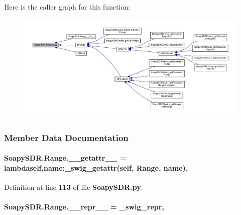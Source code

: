 Here is the caller graph for this function\+:
\nopagebreak
\begin{figure}[H]
\begin{center}
\leavevmode
\includegraphics[width=350pt]{d7/de1/classSoapySDR_1_1Range_accd0e887cd11dee091a82532c9596ce1_icgraph}
\end{center}
\end{figure}




\subsubsection{Member Data Documentation}
\paragraph[{\+\_\+\+\_\+getattr\+\_\+\+\_\+}]{\setlength{\rightskip}{0pt plus 5cm}Soapy\+S\+D\+R.\+Range.\+\_\+\+\_\+getattr\+\_\+\+\_\+ = lambdaself,name\+:\+\_\+swig\+\_\+getattr(self, {\bf Range}, {\bf name})\hspace{0.3cm}{\ttfamily [static]}, {\ttfamily [private]}}\label{classSoapySDR_1_1Range_a8811aae1d9f39646abb2340e400d0a0b}


Definition at line {\bf 113} of file {\bf Soapy\+S\+D\+R.\+py}.

\paragraph[{\+\_\+\+\_\+repr\+\_\+\+\_\+}]{\setlength{\rightskip}{0pt plus 5cm}Soapy\+S\+D\+R.\+Range.\+\_\+\+\_\+repr\+\_\+\+\_\+ = {\bf \+\_\+swig\+\_\+repr}\hspace{0.3cm}{\ttfamily [static]}, {\ttfamily [private]}}\label{classSoapySDR_1_1Range_a643748f47894a00b462231b4894e9de9}


